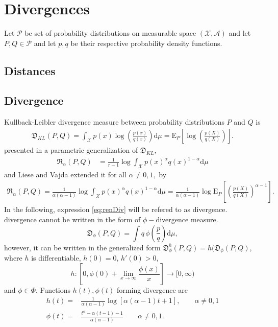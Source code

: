 \chapter{Divergences}
Let $\mathcal{P}$ be set of probability distributions on measurable space $(\mathcal{X, A})$ and let $P,Q \in \mathcal{P} $ and let $p,q$ be their respective probability density functions.
\section{Distances}
\section{\ren Divergence}

Kullback-Leibler divergence measure between probability distributions $P$ and $ Q$ is 
\begin{align*}
\mathfrak{D}_{KL}(P,Q) =  \int_\mathcal{X} p(x)\log\left( \frac{p(x)}{q(x)}\right) \mathrm{d}\mu  = \mathrm{E}_P\left[ \log \left( \frac{p(X)}{q(X)}\right) \right].
\end{align*}
\ren presented in \cite{Renyi1961} a parametric generalization of $\mathfrak{D}_{KL}$,
\begin{align*}
\mathfrak{R}_\alpha(P,Q) & = \frac{1}{r-1} \log\int_\mathcal{X} p(x)^\alpha q(x)^{1-\alpha}\mathrm{d}\mu 
\end{align*}
and Liese and Vajda \cite{LieseVajda1987} extended it for all $\alpha \neq 0,1,$ by
\begin{equation}
\begin{aligned}
\mathfrak{R}_\alpha(P,Q)  = \frac{1}{\alpha(\alpha-1)} \log\int_\mathcal{X} p(x)^\alpha q(x)^{1-\alpha}\mathrm{d}\mu = \frac{1}{\alpha(\alpha-1)} \log \mathrm{E}_P\left[  \left( \frac{p(X)}{q(X)}\right)^{\alpha -1} \right].
\label{eq:renDiv}
\end{aligned}
\end{equation}
In the following, expression \eqref{eq:renDiv} will be refered to as \ren divergence.
\ren divergence cannot be written in the form of $\phi-$divergence measure. 
\begin{equation}
\mathfrak{D}_\phi (P,Q) = \int q \,\phi\left( \frac{p}{q} \right)\mathrm{d}\mu,
\end{equation}
however, it can be written in the generalized form $\mathfrak{D}_\phi^h(P,Q) = h( \mathfrak{D}_{\phi}(P,Q)$, where  $h$ is differentiable, $h(0) = 0$, $h' (0) > 0 $,  \[h : \left[0,\phi(0) + \lim_{x\rightarrow \infty} \frac{\phi(x)}{x} \right] \rightarrow [0,\infty)\] and $\phi \in \Phi$. Functions $h(t), \phi(t)$ forming \ren divergence are 
\begin{align*}
h(t) = & \frac{1}{\alpha(\alpha-1)} \log\left[ \alpha(\alpha - 1)t + 1\right], \qquad \alpha \neq 0,1 \\
\phi(t) = & \frac{t^\alpha - \alpha(t-1) -1}{\alpha(\alpha -1)} \qquad \alpha \neq 0,1.
\end{align*}

